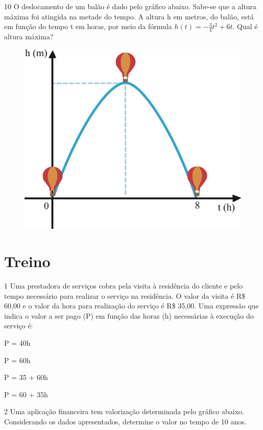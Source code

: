 \pagebreak
\num{10} O deslocamento de um balão é dado pelo gráfico abaixo. Sabe-se que a
altura máxima foi atingida na metade do tempo. A altura h em metros, do
balão, está em função do tempo t em horas, por meio da fórmula 
$h(t) = - \frac{3}{4} t^2 + 6t$. Qual é altura máxima?

\begin{figure}[htpb!]
\centering
\includegraphics[width=.5\textwidth]{./ilustras-mat/modulo_9-atividade_10.png}
\end{figure}

\begin{emptybox}
\end{emptybox}

\section*{Treino}

\num{1} Uma prestadora de serviços cobra pela visita à residência do
cliente e pelo tempo necessário para realizar o serviço na residência. O
valor da visita é R\$ 60,00 e o valor da hora para realização do serviço é
R\$ 35,00. Uma expressão que indica o valor a ser pago (P) em função das
horas (h) necessárias à execução do serviço é:

\begin{escolha}
  \item P = 40h

  \item P = 60h

  \item P = 35 + 60h

  \item P = 60 + 35h
\end{escolha}

\pagebreak
\num{2} Uma aplicação financeira tem valorização determinada pelo gráfico abaixo.
Considerando os dados apresentados, determine o valor no tempo de 10 anos.

